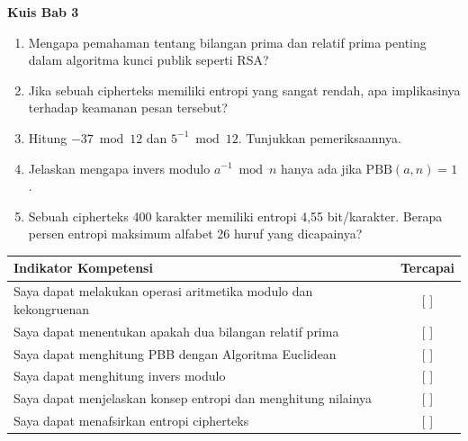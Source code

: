 \begin{obeassessment}
\textbf{Kuis Bab 3}
\begin{enumerate}
    \item Mengapa pemahaman tentang bilangan prima dan relatif prima penting
          dalam algoritma kunci publik seperti RSA?
    \item Jika sebuah cipherteks memiliki entropi yang sangat rendah, apa
          implikasinya terhadap keamanan pesan tersebut?
    \item Hitung $-37 \bmod 12$ dan $5^{-1} \bmod 12$. Tunjukkan pemeriksaannya.
    \item Jelaskan mengapa invers modulo $a^{-1} \bmod n$ hanya ada jika
          $\text{PBB}(a,n)=1$.
    \item Sebuah cipherteks 400 karakter memiliki entropi 4,55 bit/karakter.
          Berapa persen entropi maksimum alfabet 26 huruf yang dicapainya?
\end{enumerate}
\end{obeassessment}
\begin{competencychecklist}
\begin{tabularx}{\linewidth}{|X|c|}
\hline
Indikator Kompetensi & Tercapai \\
\hline
Saya dapat melakukan operasi aritmetika modulo dan kekongruenan & [ ] \\
\hline
Saya dapat menentukan apakah dua bilangan relatif prima & [ ] \\
\hline
Saya dapat menghitung PBB dengan Algoritma Euclidean & [ ] \\
\hline
Saya dapat menghitung invers modulo & [ ] \\
\hline
Saya dapat menjelaskan konsep entropi dan menghitung nilainya & [ ] \\
\hline
Saya dapat menafsirkan entropi cipherteks & [ ] \\
\hline
\end{tabularx}
\end{competencychecklist}
